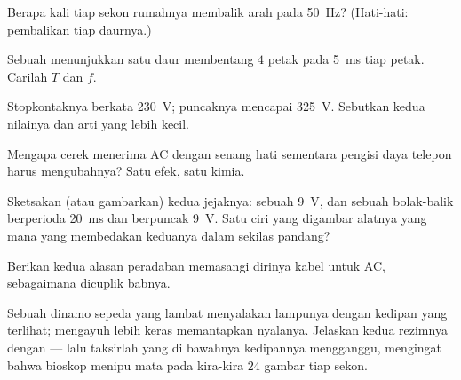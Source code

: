 \begin{exercise}[$\star$]\label{exo:g9:alternating-current:3}
Berapa kali tiap sekon  rumahnya membalik arah pada
\qty{50}{Hz}? (Hati-hati: pembalikan tiap daurnya.)
\end{exercise}

\begin{exercise}[$\star$]\label{exo:g9:alternating-current:4}
Sebuah  menunjukkan satu daur membentang $4$ petak pada
\qty{5}{ms} tiap petak. Carilah $T$ dan $f$.
\end{exercise}

\begin{exercise}[$\star$]\label{exo:g9:alternating-current:5}
Stopkontaknya berkata \qty{230}{V}; puncaknya mencapai \qty{325}{V}.
Sebutkan kedua nilainya dan arti yang lebih kecil.
\end{exercise}

\begin{exercise}[$\star$]\label{exo:g9:alternating-current:6}
Mengapa cerek menerima AC dengan senang hati sementara pengisi daya
telepon harus mengubahnya? Satu efek, satu kimia.
\end{exercise}

\begin{exercise}[$\star$]\label{exo:g9:alternating-current:7}
Sketsakan (atau gambarkan) kedua jejaknya: sebuah  \qty{9}{V},
dan sebuah  bolak-balik berperioda \qty{20}{ms} dan berpuncak
\qty{9}{V}. Satu ciri yang digambar alatnya yang mana yang membedakan
keduanya dalam sekilas pandang?
\end{exercise}

\begin{exercise}[$\star$]\label{exo:g9:alternating-current:8}
Berikan kedua alasan peradaban memasangi dirinya kabel untuk AC,
sebagaimana dicuplik babnya.
\end{exercise}

\begin{exercise}[$\star\star$]\label{exo:g9:alternating-current:9}
Sebuah dinamo sepeda yang lambat menyalakan lampunya dengan kedipan
yang terlihat; mengayuh lebih keras memantapkan nyalanya. Jelaskan
kedua rezimnya dengan  --- lalu taksirlah  yang di
bawahnya kedipannya mengganggu, mengingat bahwa bioskop menipu mata
pada kira-kira $24$ gambar tiap sekon.
\end{exercise}

